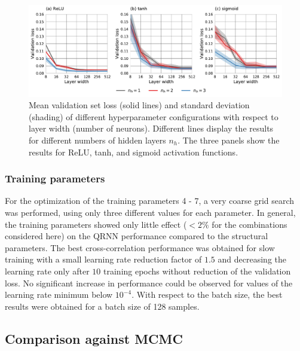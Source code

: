 \documentclass[journal abbreviation, manuscript]{copernicus}
\begin{document}
  \begin{figure}[hbpt!]
    \centering
    \includegraphics[width = 1.0\linewidth]{../plots/fig02}
    \caption{Mean validation set loss (solid lines) and standard deviation (shading)
             of different hyperparameter configurations with respect to layer width (number of neurons).
             Different lines display the results for different numbers of hidden layers $n_h$.
             The three panels show the results for ReLU, tanh, and sigmoid activation functions.}
    \label{fig:hyperparams}
  \end{figure}

 \subsubsection{Training parameters}
 
For the optimization of the training parameters 4 - 7, a very coarse grid
search was performed, using only three different values for each parameter.
In general, the training parameters showed only little effect ($< 2\%$ for the
combinations considered here) on the QRNN performance compared to the structural
parameters. The best cross-correlation performance was obtained for slow
training with a small learning rate reduction factor of $1.5$ and decreasing the
learning rate only after $10$ training epochs without reduction of the
validation loss. No significant increase in performance could be observed for
values of the learning rate minimum below $10^{-4}$. With respect to the batch
size, the best results were obtained for a batch size of 128 samples.

\subsection{Comparison against MCMC}
  
\end{document}
